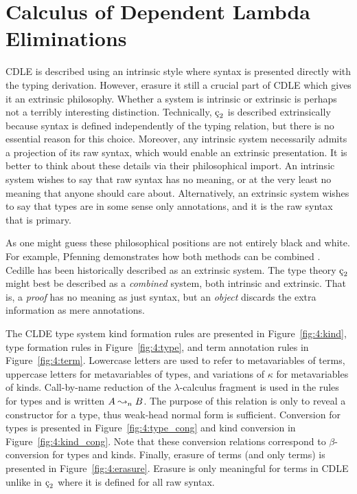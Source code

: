 \section{Calculus of Dependent Lambda Eliminations}

CDLE is described using an intrinsic style where syntax is presented directly with the typing derivation.
However, erasure it still a crucial part of CDLE which gives it an extrinsic philosophy.
Whether a system is intrinsic or extrinsic is perhaps not a terribly interesting distinction.
Technically, $\ced$ is described extrinsically because syntax is defined independently of the typing relation, but there is no essential reason for this choice.
Moreover, any intrinsic system necessarily admits a projection of its raw syntax, which would enable an extrinsic presentation.
It is better to think about these details via their philosophical import.
An intrinsic system wishes to say that raw syntax has no meaning, or at the very least no meaning that anyone should care about.
Alternatively, an extrinsic system wishes to say that types are in some sense only annotations, and it is the raw syntax that is primary.




As one might guess these philosophical positions are not entirely black and white.
For example, Pfenning demonstrates how both methods can be combined \cite{pfenning2008church}.
Cedille has been historically described as an extrinsic system.
The type theory $\ced$ might best be described as a \textit{combined} system, both intrinsic and extrinsic.
That is, a \textit{proof} has no meaning as just syntax, but an \textit{object} discards the extra information as mere annotations.

The CLDE type system kind formation rules are presented in Figure~\ref{fig:4:kind}, type formation rules in Figure~\ref{fig:4:type}, and term annotation rules in Figure~\ref{fig:4:term}.
Lowercase letters are used to refer to metavariables of terms, uppercase letters for metavariables of types, and variations of $\kappa$ for metavariables of kinds.
Call-by-name reduction of the $\lambda$-calculus fragment is used in the rules for types and is written $A \leadsto_n B$.
The purpose of this relation is only to reveal a constructor for a type, thus weak-head normal form is sufficient.
Conversion for types is presented in Figure~\ref{fig:4:type_cong} and kind conversion in Figure~\ref{fig:4:kind_cong}.
Note that these conversion relations correspond to $\beta$-conversion for types and kinds.
Finally, erasure of terms (and only terms) is presented in Figure~\ref{fig:4:erasure}.
Erasure is only meaningful for terms in CDLE unlike in $\ced$ where it is defined for all raw syntax.

